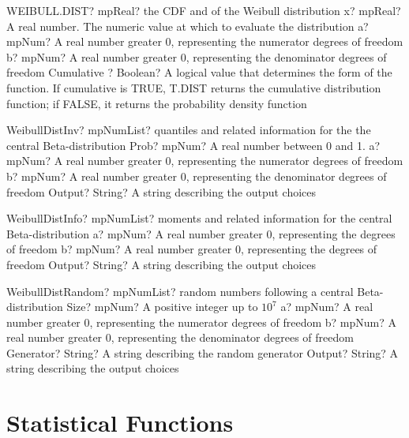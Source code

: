 \documentclass[12pt,a4paper,openany]{book}
\begin{document}
\begin{mpFunctionsExtract}
\mpWorksheetFunctionFourNotImplemented
{WEIBULL.DIST? mpReal? the CDF and of the Weibull distribution}
{x? mpReal? A real number. The numeric value at which to evaluate the distribution}
{a? mpNum? A real number greater 0, representing the numerator  degrees of freedom}
{b? mpNum? A real number greater 0, representing the denominator degrees of freedom}
{Cumulative ? Boolean? A logical value that determines the form of the function. If cumulative is TRUE, T.DIST returns the cumulative distribution function; if FALSE, it returns the probability density function}
\end{mpFunctionsExtract}

\begin{mpFunctionsExtract}
\mpFunctionFourNotImplemented
{WeibullDistInv? mpNumList? quantiles and related information for the the central Beta-distribution}
{Prob? mpNum? A real number between 0 and 1.}
{a? mpNum? A real number greater 0, representing the numerator  degrees of freedom}
{b? mpNum? A real number greater 0, representing the denominator degrees of freedom}
{Output? String? A string describing the output choices}
\end{mpFunctionsExtract}

\begin{mpFunctionsExtract}
\mpFunctionThreeNotImplemented
{WeibullDistInfo? mpNumList? moments and related information for the central Beta-distribution}
{a? mpNum? A real number greater 0, representing the degrees of freedom}
{b? mpNum? A real number greater 0, representing the degrees of freedom}
{Output? String? A string describing the output choices}
\end{mpFunctionsExtract}

\begin{mpFunctionsExtract}
\mpFunctionFiveNotImplemented
{WeibullDistRandom? mpNumList? random numbers following a central Beta-distribution}
{Size? mpNum? A positive integer up to $10^7$}
{a? mpNum? A real number greater 0, representing the numerator  degrees of freedom}
{b? mpNum? A real number greater 0, representing the denominator degrees of freedom}
{Generator? String? A string describing the random generator}
{Output? String? A string describing the output choices}
\end{mpFunctionsExtract}

\chapter{Statistical Functions}
\end{document}
